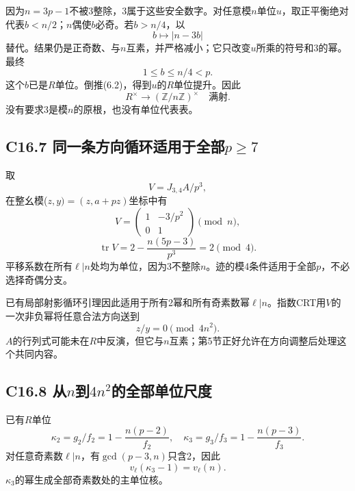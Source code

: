 \documentclass[11pt,a4paper]{article}
\theoremstyle{definition}
\numberwithin{equation}{section}
\begin{document}
{因为\ensuremath{n=3p-1}不被3整除，3属于这些安全数字。对任意模\ensuremath{n}单位\ensuremath{u}，取正平衡绝对代表\ensuremath{b<n/2}；\ensuremath{n}偶使\ensuremath{b}必奇。若\ensuremath{b>n/4}，以} \[
b\longmapsto |n-3b|
\tag{C16.6.2}
\] {替代。结果仍是正奇数、与\ensuremath{n}互素，并严格减小；它只改变\ensuremath{u}所乘的符号和3的幂。最终} \[
1\le b\le n/4<p.
\] {这个\ensuremath{b}已是\ensuremath{R}单位。倒推(6.2)，得到\ensuremath{u}的\ensuremath{R}单位提升。因此} \[
R^\times\longrightarrow(\mathbb Z/n\mathbb Z)^\times
\quad\text{满射}.
\tag{C16.6.3}
\] {没有要求3是模\ensuremath{n}的原根，也没有单位代表表。}

\subsection*{\texorpdfstring{{C16.7} {同一条方向循环适用于全部\ensuremath{p\ge 7}}}{C16.7 同一条方向循环适用于全部}}\label{C16-h119}

{取} \[
V=J_{3,4}A/p^3,
\] {在整幺模(\ensuremath{z,y)=(z,a+pz)}坐标中有} \[
V=\begin{pmatrix}1&-3/p^2\\0&1\end{pmatrix}\pmod n,
\] \[
\operatorname{tr}V=2-\frac{n(5p-3)}{p^3}=2\pmod4.
\tag{C16.7.1}
\] {平移系数在所有\ensuremath{\ell |n}处均为单位，因为3不整除\ensuremath{n}。迹的模4条件适用于全部\ensuremath{p}，不必选择奇偶分支。}

{已有局部射影循环引理因此适用于所有2幂和所有奇素数幂\ensuremath{\ell |n}。指数CRT用\ensuremath{V}的一次非负幂将任意合法方向送到} \[
z/y=0\pmod{4n^2}.
\tag{C16.7.2}
\] {\ensuremath{A}的行列式可能未在\ensuremath{R}中反演，但它与\ensuremath{n}互素；第5节正好允许在方向调整后处理这个共同内容。}

\subsection*{\texorpdfstring{{C16.8} {从\ensuremath{n}到\ensuremath{4n^{2}}的全部单位尺度}}{C16.8 从到的全部单位尺度}}\label{C16-h120}

{已有\ensuremath{R}单位} \[
\kappa_2=g_2/f_2=1-\frac{n(p-2)}{f_2},\quad
\kappa_3=g_3/f_3=1-\frac{n(p-3)}{f_3}.
\] {对任意奇素数\ensuremath{\ell |n}，有\ensuremath{\operatorname{gcd}(p-3,n)}只含2，因此} \[
v_\ell(\kappa_3-1)=v_\ell(n).
\] {\ensuremath{\kappa _{3}}的幂生成全部奇素数处的主单位核。}
\end{document}
